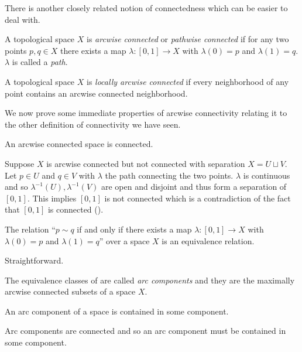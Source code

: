 \documentclass[letterpaper, 11pt, oneside]{book}
\begin{document}
There is another closely related notion of connectedness which can be easier to deal with.

\begin{defn}
  A topological space $X$ is \emph{arcwise connected} or \emph{pathwise connected} if for any two points $p,q \in X$ there exists a map $\lambda\colon [0, 1] \to X$ with $\lambda(0) = p$ and $\lambda(1) = q$.
  $\lambda$ is called a \emph{path}.
\end{defn}

\begin{defn}
  A topological space $X$ is \emph{locally arcwise connected} if every neighborhood of any point contains an arcwise connected neighborhood.
\end{defn}

We now prove some immediate properties of arcwise connectivity relating it to the other definition of connectivity we have seen.

\begin{prop}
  An arcwise connected space is connected.
\end{prop}
\begin{pf}
  Suppose $X$ is arcwise connected but not connected with separation $X = U \sqcup V$.
  Let $p \in U$ and $q \in V$ with $\lambda$ the path connecting the two points.
  $\lambda$ is continuous and so $\lambda^{-1}(U), \lambda^{-1}(V)$ are open and disjoint and thus form a separation of $[0, 1]$.
  This implies $[0, 1]$ is not connected which is a contradiction of the fact that $[0, 1]$ is connected ().
\end{pf}

\begin{prop}\label{prop: arc_eq_rel}
  The relation ``$p \sim q$ if and only if there exists a map $\lambda\colon [0, 1] \to X$ with $\lambda(0) = p$ and $\lambda(1) = q$'' over a space $X$ is an equivalence relation.
\end{prop}
\begin{pf}
  Straightforward.
\end{pf}

\begin{defn}
  The equivalence classes of  are called \emph{arc components} and they are the maximally arcwise connected subsets of a space $X$.
\end{defn}

\begin{prop}
  An arc component of a space is contained in some component.
\end{prop}
\begin{pf}
  Arc components are connected and so an arc component must be contained in some component.
\end{pf}
\end{document}
